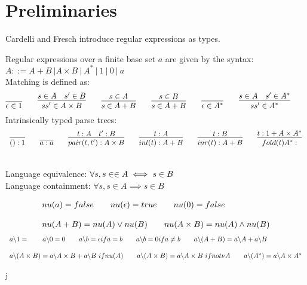 \documentclass[a4paper,UKenglish,cleveref, autoref, thm-restate]{lipics-v2021}
\newcommand\mycomment[1]{}
\begin{document}
\section{Preliminaries}
\mycomment{double check it is 900 lines it takes to prove this}
Cardelli and Fresch introduce regular expressions as types.
\begin{definition}
Regular expressions over a finite base set $a$ are given by the syntax:\\
$A ::= A + B~| A \times B ~|~A ^* ~|~ 1 ~|~ 0 ~|~ a$\\
Matching is defined as:\\
\begin{displaymath} 
\infer{\match{\epsilon}{1}}{}\qquad
\infer{\match{s s'}{A \times B}}{\match{s}{A} & \match{s'}{B}} \qquad
\infer{\match{s} {A + B}}{\match{s}{A}} \qquad
\infer{\match{s} {A + B}}{\match{s}{B}} \qquad
\infer{\match{\epsilon}{A^*}}{}\qquad
\infer{\match{s s'}{A^*}}{\match{s}{A} & \match{s'}{A^*}}\qquad
\end{displaymath}
Intrinsically typed parse trees:
\begin{displaymath}
\begin{array}{l}
\infer{\oft{()}{1}}{} \qquad 
\infer{\oft{a}{a}}{} \qquad \infer{\oft{\pair{t}{t'}}{A \times B}}{\oft{t}{A} & \oft{t'}{B}}
\qquad \infer{\oft{\inl {t}}{A + B}}{\oft{t}{A}} \qquad
\infer{\oft{\inr {t}}{A + B}}{\oft{t}{B}}  \qquad
\infer{\oft{\fold{t}{A^*}}}{\oft{t}{1 + A \times A^*}}
\end{array}
\end{displaymath}
\end{definition}
\begin{definition}[Equivalence] \noindent \\
Language equivalence: $\forall s, s \in \in A \iff s \in B$\\
Language containment: $\forall s, s \in A \implies s \in B$
\end{definition}
\begin{definition}
\begin{displaymath}
\begin{array}{l}
\mynu{a} = \false \qquad
\mynu{\epsilon} = \true \qquad
\mynu{0} = \false
\\\\
\mynu{A + B} = \mynu A  \lor \mynu B \qquad
\mynu{A \times B} = \mynu A  \land \mynu B
\end{array}
\end{displaymath}
\begin{displaymath}
\begin{array}{l}
\derive {a}{1} = \qquad
\derive{a}{0} = 0 \qquad
\derive{a}{b} = \epsilon if a = b\qquad
\derive{a}{b} = 0 if a \neq b\qquad
\derive {a}{(A + B)} = \derive{a}{A} +  \derive{a}{B}\qquad
\\\\
\derive {a}{(A \times B)} = \derive{a}{A} \times B +  \derive{a}{B} ~if \mynu{A} \qquad
\derive {a}{(A \times B)} = \derive{a}{A} \times B ~if not \nu{A} \qquad
\derive {a}{(A^*)} = \derive{a}{A} \times A^*
\end{array}
\end{displaymath}
\end{definition}j
\end{document}

